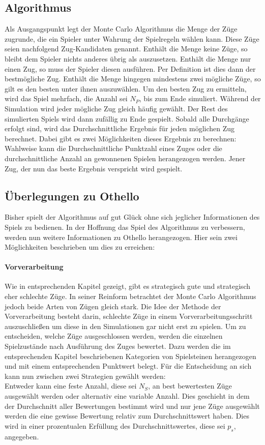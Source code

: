 \subsection{Algorithmus}
Als Ausgangspunkt legt der Monte Carlo Algorithmus die Menge der Züge zugrunde, die ein Spieler unter Wahrung der Spielregeln wählen kann. Diese Züge seien nachfolgend Zug-Kandidaten genannt. Enthält die Menge keine Züge, so bleibt dem Spieler nichts anderes übrig als auszusetzen. Enthält die Menge nur einen Zug, so muss der Spieler diesen ausführen. Per Definition ist dies dann der bestmögliche Zug. Enthält die Menge hingegen mindestens zwei mögliche Züge, so gilt es den besten unter ihnen auszuwählen. Um den besten Zug zu ermitteln, wird das Spiel mehrfach, die Anzahl sei $N_{P}$, bis zum Ende simuliert. Während der Simulation wird jeder mögliche Zug gleich häufig gewählt. Der Rest des simulierten Spiels wird dann zufällig zu Ende gespielt. Sobald alle Durchgänge erfolgt sind, wird das Durchschnittliche Ergebnis für jeden möglichen Zug berechnet. Dabei gibt es zwei Möglichkeiten dieses Ergebnis zu berechnen:\\
Wahlweise kann die Durchschnittliche Punktzahl eines Zuges oder die durchschnittliche Anzahl an gewonnenen Spielen herangezogen werden. Jener Zug, der nun das beste Ergebnis verspricht wird gespielt.
\subsection{Überlegungen zu Othello}
Bisher spielt der Algorithmus auf gut Glück ohne sich jeglicher Informationen des Spiels zu bedienen. In der Hoffnung das Spiel des Algorithmus zu verbessern, werden nun weitere Informationen zu Othello herangezogen. Hier sein zwei Möglichkeiten beschrieben um dies zu erreichen:
\paragraph{Vorverarbeitung}Wie in entsprechenden Kapitel gezeigt, gibt es strategisch gute und strategisch eher schlechte Züge. In seiner Reinform betrachtet der Monte Carlo Algorithmus jedoch beide Arten von Zügen gleich stark. Die Idee der Methode der Vorverarbeitung besteht darin, schlechte Züge in einem Vorverarbeitungsschritt auszuschließen um diese in den Simulationen gar nicht erst zu spielen. Um zu entscheiden, welche Züge ausgeschlossen werden, werden die einzelnen Spielzustände nach Ausführung des Zuges bewertet. Dazu werden die im entsprechenden Kapitel beschriebenen Kategorien von Spielsteinen herangezogen und mit einem entsprechenden Punktwert belegt. Für die Entscheidung an sich kann nun zwischen zwei Strategien gewählt werden:\\
Entweder kann eine feste Anzahl, diese sei $N_{S}$, an best bewertesten Züge ausgewählt werden oder alternativ eine variable Anzahl. Dies geschieht in dem der Durchschnitt aller Bewertungen bestimmt wird und nur jene Züge ausgewählt werden die eine gewisse Bewertung relativ zum Durchschnittswert haben. Dies wird in einer prozentualen Erfüllung des Durchschnittswertes, diese sei $p_{s}$, angegeben.
